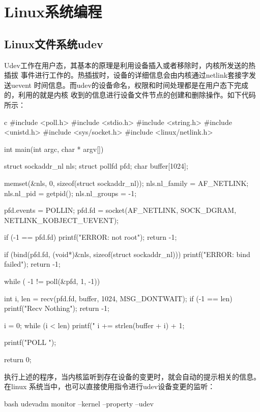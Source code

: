 \chapter{Linux系统编程}

\section{Linux文件系统udev}
Udev工作在用户态，其基本的原理是利用设备插入或者移除时，内核所发送的热插拔
事件进行工作的。热插拔时，设备的详细信息会由内核通过netlink套接字发送uevent
时间信息。而udev的设备命名，权限和时间处理都是在用户态下完成的，利用的就是内核
收到的信息进行设备文件节点的创建和删除操作。如下代码所示：
\begin{code-block}{c}
#include <poll.h>
#include <stdio.h>
#include <string.h>
#include <unistd.h>
#include <sys/socket.h>
#include <linux/netlink.h>

int main(int argc, char * argv[])
{
        struct sockaddr_nl nls;
        struct pollfd pfd;
        char buffer[1024];

        memset(&nls, 0, sizeof(struct sockaddr_nl));
        nls.nl_family = AF_NETLINK;
        nls.nl_pid = getpid();
        nls.nl_groups = -1;

        pfd.events = POLLIN;
        pfd.fd = socket(AF_NETLINK, SOCK_DGRAM, NETLINK_KOBJECT_UEVENT);

        if (-1 == pfd.fd) {
                printf("ERROR: not root\n");
                return -1;
        }

        if (bind(pfd.fd, (void*)&nls, sizeof(struct sockaddr_nl))) {
                printf("ERROR: bind failed\n");
                return -1;
        }

        while ( -1 != poll(&pfd, 1, -1)) {
                int i, len = recv(pfd.fd, buffer, 1024, MSG_DONTWAIT);
                if (-1 == len) {
                        printf("Recv Nothing\n");
                        return -1;
                }

                i = 0;
                while (i < len) {
                        printf("%
                        i += strlen(buffer + i) + 1;
                }
        }

        printf("POLL \n");

        return 0;
}
\end{code-block}
执行上述的程序，当内核监听到存在设备的变更时，就会自动的提示相关的信息。在linux
系统当中，也可以直接使用指令进行udev设备变更的监听：
\begin{code-block}{bash}
udevadm monitor --kernel --property --udev
\end{code-block}

